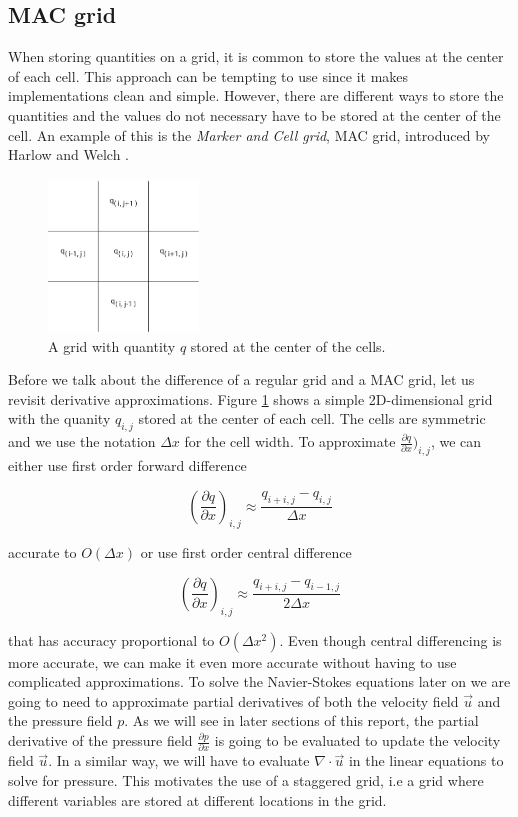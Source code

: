 \subsection{MAC grid}

When storing quantities on a grid, it is common to store the values at the center of each cell. This approach can be tempting to use since it makes implementations clean and simple. However, there are different ways to store the quantities and the values do not necessary have to be stored at the center of the cell. An example of this is the \emph{Marker and Cell grid}, MAC grid, introduced by Harlow and Welch \cite{mac}.

\begin{figure}[ht!]
\centering
\includegraphics[width=40mm]{img/mac.pdf}
\caption{A grid with quantity $q$ stored at the center of the cells.}
\label{regulargrid}
\end{figure}
\noindent
Before we talk about the difference of a regular grid and a MAC grid, let us revisit derivative approximations. Figure \ref{regulargrid} shows a simple 2D-dimensional grid with the quanity $q_{i,j}$ stored at the center of each cell. The cells are symmetric and we use the notation $\Delta x$ for the cell width. To approximate $\frac{\partial q}{\partial x})_{i,j} $, we can either use first order forward difference 

\begin{equation}
(\frac{\partial q}{\partial x})_{i,j} \approx \frac{q_{i+i,j} - q_{i,j}}{\Delta x}
\end{equation}

accurate to $O(\Delta x)$ or use first order central difference

\begin{equation}
(\frac{\partial q}{\partial x})_{i,j} \approx \frac{q_{i+i,j} - q_{i-1,j}}{2\Delta x}
\label{centraldifference}
\end{equation}

that has accuracy proportional to $O(\Delta x^{2})$. Even though central differencing is more accurate, we can make it even more accurate without having to use complicated approximations. To solve the Navier-Stokes equations later on we are going to need to approximate partial derivatives of both the velocity field $\vec{u}$ and the pressure field $p$. As we will see in later sections of this report, the partial derivative of the pressure field $\frac{\partial p}{\partial x}$ is going to be evaluated to update the velocity field $\vec{u}$. In a similar way, we will have to evaluate $\nabla \cdot \vec{u}$ in the linear equations to solve for pressure. This motivates the use of a staggered grid, i.e a grid where different variables are stored at different locations in the grid.

